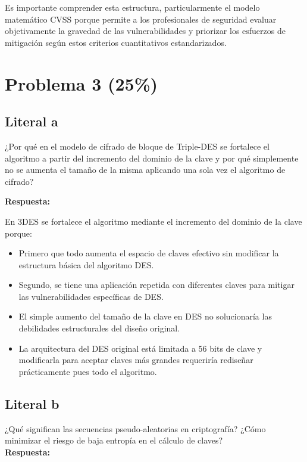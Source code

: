 {Es importante comprender esta estructura, particularmente el modelo matemático CVSS porque permite a los profesionales de seguridad evaluar objetivamente la gravedad de las vulnerabilidades y priorizar los esfuerzos de mitigación según estos criterios cuantitativos estandarizados.





\section{Problema 3 (25\%)}

\subsection{Literal a}
¿Por qué en el modelo de cifrado de bloque de Triple-DES se fortalece el algoritmo a partir del incremento del dominio de la clave y por qué simplemente no se aumenta el tamaño de la misma aplicando una sola vez el algoritmo de cifrado?

\textbf{Respuesta:}

En 3DES se fortalece el algoritmo mediante el incremento del dominio de la clave porque:
\begin{itemize}
    \item Primero que todo aumenta el espacio de claves efectivo sin modificar la estructura básica del algoritmo DES.
    \item Segundo, se tiene una aplicación repetida con diferentes claves para mitigar las vulnerabilidades específicas de DES.
    \item El simple aumento del tamaño de la clave en DES no solucionaría las debilidades estructurales del diseño original.
    \item La arquitectura del DES original está limitada a 56 bits de clave y modificarla para aceptar claves más grandes requeriría rediseñar prácticamente pues todo el algoritmo.
\end{itemize}

\subsection{Literal b}
¿Qué significan las secuencias pseudo-aleatorias en criptografía? ¿Cómo minimizar el riesgo de baja entropía en el cálculo de claves?
\\
\textbf{Respuesta:}

}
